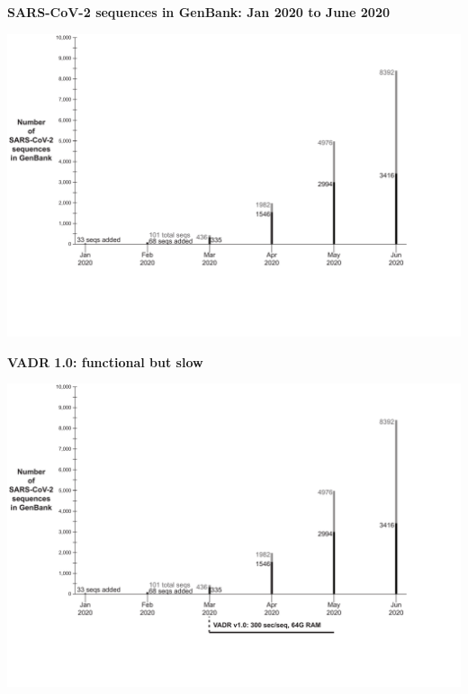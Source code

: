 \documentclass[landscape]{slides}
\begin{document}
\begin{slide}
\begin{center}
\textbf{SARS-CoV-2 sequences in GenBank: Jan 2020 to June 2020}

\includegraphics[width=10.5in]{figs/sars-counts-jan2020-may2020-slide1}
\end{center}

\vfill
\end{slide}
\begin{slide}
\begin{center}
\textbf{VADR 1.0: functional but slow}

\includegraphics[width=10.5in]{figs/sars-counts-jan2020-may2020-slide2}
\end{center}

\vfill
\end{slide}
\end{document}
